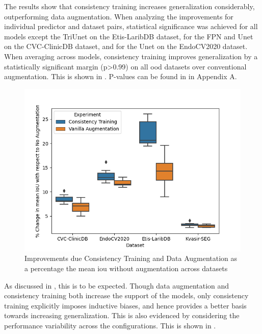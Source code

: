 The results show that consistency training increases generalization considerably, outperforming data augmentation. When analyzing the improvements for individual predictor and dataset pairs, statistical significance was achieved for all models except the TriUnet on the Etis-LaribDB dataset, for the FPN and Unet on the CVC-ClinicDB dataset, and for the Unet on the EndoCV2020 dataset. When averaging across models, consistency training improves generalization by a statistically significant margin (p>0.99) on all \gls{ood} datasets over conventional augmentation. This is shown in . P-values can be found in  in Appendix A. 
\begin{figure}[h]
    \centering
    \includegraphics[width=\linewidth]{illustrations/consistency_training_percent.png}
    \caption[Consistency Training improvements]{Improvements due Consistency Training and Data Augmentation as a percentage the mean \gls{iou} without augmentation across datasets}
    \label{fig:consistency_training}
\end{figure}

As discussed in , this is to be expected. Though data augmentation and consistency training both increase the support of the models, only consistency training explicitly imposes inductive biases, and hence provides a better basis towards increasing generalization. This is also evidenced by considering the performance variability across the configurations. This is shown in .

